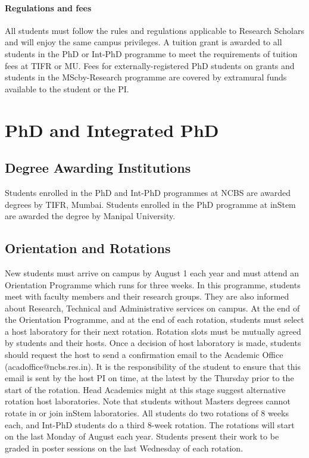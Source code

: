 \documentclass[a4paper,10pt]{article}
\begin{document}
\paragraph{Regulations and fees} All students must follow the rules and
regulations applicable to Research Scholars and will enjoy the same campus
privileges. A tuition grant is awarded to all students in the PhD or Int-PhD
programme to meet the requirements of tuition fees at TIFR or MU. Fees for
externally-registered PhD students on grants and students in the MScby-Research
programme are covered by extramural funds available to the student or the PI.
	

\section{PhD and Integrated PhD} 

\subsection{Degree Awarding Institutions}
Students enrolled in the PhD and Int-PhD programmes at NCBS are awarded degrees
by TIFR, Mumbai. Students enrolled in the PhD programme at inStem are awarded
the degree by Manipal University.  

\subsection{Orientation and Rotations}
New students must
arrive on campus by August 1 each year and must attend an Orientation Programme
which runs for three weeks. In this programme, students meet with faculty
members and their research groups. They are also informed about Research,
Technical and Administrative services on campus. At the end of the Orientation
Programme, and at the end of each rotation, students must select a host
laboratory for their next rotation. Rotation slots must be mutually agreed by
students and their hosts. Once a decision of host laboratory is made, students
should request the host to send a confirmation email to the Academic Office
(acadoffice@ncbs.res.in). It is the responsibility of the student to ensure that
this email is sent by the host PI on time, at the latest by the Thursday prior
to the start of the rotation. Head Academics might at this stage suggest
alternative rotation host laboratories. Note that students without Masters
degrees cannot rotate in or join inStem laboratories. All students do two
rotations of 8 weeks each, and Int-PhD students do a third 8-week rotation. The
rotations will start on the last Monday of August each year. Students present
their work to be graded in poster sessions on the last Wednesday of each
rotation.  
\end{document}
